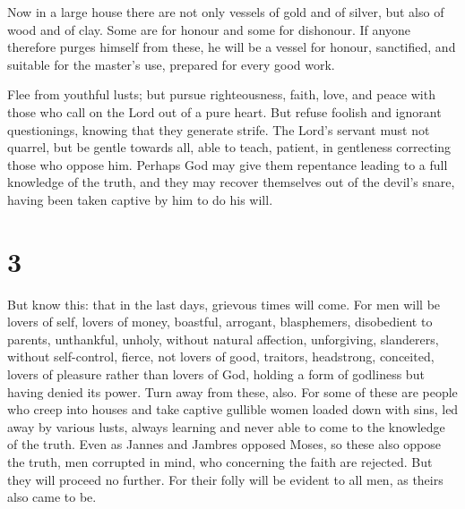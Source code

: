  Now in a large house there are not only vessels of gold
and of silver, but also of wood and of clay. Some are for honour and
some for dishonour.  If anyone therefore purges himself
from these, he will be a vessel for honour, sanctified, and suitable for
the master's use, prepared for every good work.

 Flee from youthful lusts; but pursue righteousness, faith,
love, and peace with those who call on the Lord out of a pure heart.
 But refuse foolish and ignorant questionings, knowing that
they generate strife.  The Lord's servant must not quarrel,
but be gentle towards all, able to teach, patient,  in
gentleness correcting those who oppose him. Perhaps God may give them
repentance leading to a full knowledge of the truth,  and
they may recover themselves out of the devil's snare, having been taken
captive by him to do his will.

\hypertarget{section-2}{%
\section{3}\label{section-2}}

 But know this: that in the last days, grievous times will
come.  For men will be lovers of self, lovers of money,
boastful, arrogant, blasphemers, disobedient to parents, unthankful,
unholy,  without natural affection, unforgiving, slanderers,
without self-control, fierce, not lovers of good,  traitors,
headstrong, conceited, lovers of pleasure rather than lovers of God,
 holding a form of godliness but having denied its power.
Turn away from these, also.  For some of these are people
who creep into houses and take captive gullible women loaded down with
sins, led away by various lusts,  always learning and never
able to come to the knowledge of the truth.  Even as Jannes
and Jambres opposed Moses, so these also oppose the truth, men corrupted
in mind, who concerning the faith are rejected.  But they
will proceed no further. For their folly will be evident to all men, as
theirs also came to be.


